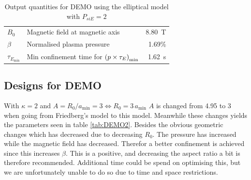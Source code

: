 \begin{table}
\begin{tabular}{llr}
		\(B_0\)                   & Magnetic field at magnetic axis                                & \SI{8.80}{\tesla}              \\
		\(\beta\)                 & Normalised plasma pressure                                     & 1.69\%                         \\
		\(\tau_{E_\mathrm{min}}\) & Min confinement time for \(\pqty{p\times\tau_E}_\mathrm{min}\) & \SI{1.62}{\second}             \\
		\bottomrule
	\end{tabular}
	\caption{Output quantities for DEMO using the elliptical model with $P_{si{E}}=2$}
	\label{tab:DEMO}
\end{table}

\subsection{Designs for DEMO}

With $\kappa=2$ and $A=R_{0}/a_{\min}=3\Leftrightarrow R_{0}=3\, a_{\min}$ $A$ is changed from 4.95 to 3 when going from Friedberg's model to this model. Meanwhile these changes yields the parameters seen in table \ref{tab:DEMO2}. Besides the obvious geometric changes which has decreased due to decreasing $R_{0}$. The pressure has increased while the magnetic field has decreased. Therefor a better confinement is achieved since this increases $\beta$. This is a positive, and decreasing the aspect ratio a bit is therefore recommended. Additional time could be spend on optimising this, but we are unfortunately unable to do so due to time and space restrictions.

